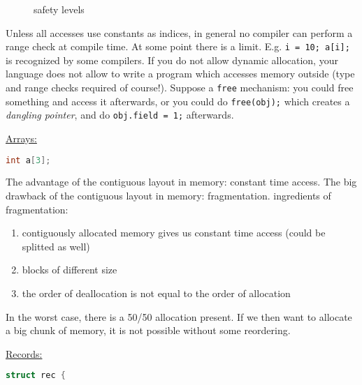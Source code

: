 {{\begin{figure}[H]
			\caption{safety levels}
			\label{fig:safetylevels}
		\end{figure}
	}
	\par{
		\noindent
		Unless all accesses use constants as indices, in general no compiler can perform a range check at compile time. At some point there is a limit. E.g. \texttt{i = 10; a[i];} is recognized by some compilers. \newline
		If you do not allow dynamic allocation, your language does not allow to write a program which accesses memory outside (type and range checks required of course!). \newline
		Suppose a \texttt{free} mechanism: you could free something and access it afterwards, or you could do \texttt{free(obj);} which creates a \textit{dangling pointer}, and do \texttt{obj.field = 1;} afterwards.
	}
	\par{
		\noindent
		\begin{minipage}{0.45\textwidth}
			\setlength{\parskip}{12pt plus2pt minus2pt}
			\par{
				\noindent\underline{Arrays:}
				\begin{lstlisting}[language = C, frame = none]
	int a[3];
				\end{lstlisting}
				The advantage of the contiguous layout in memory: constant time access.\newline
				The big drawback of the contiguous layout in memory: fragmentation.  ingredients of fragmentation:
				\parskip0pt\begin{enumerate}
					\item{contiguously allocated memory gives us constant time access (could be splitted as well)}
					\item{blocks of different size}
					\item{the order of deallocation is not equal to the order of allocation}
				\end{enumerate}
				In the worst case, there is a 50/50 allocation present. If we then want to allocate a big chunk of memory, it is not possible without some reordering.
			}
			\par{
				\noindent\underline{Records:}
				\begin{lstlisting}[language = C, frame = none]
	struct rec {

\end{lstlisting}}
\end{minipage}}}
